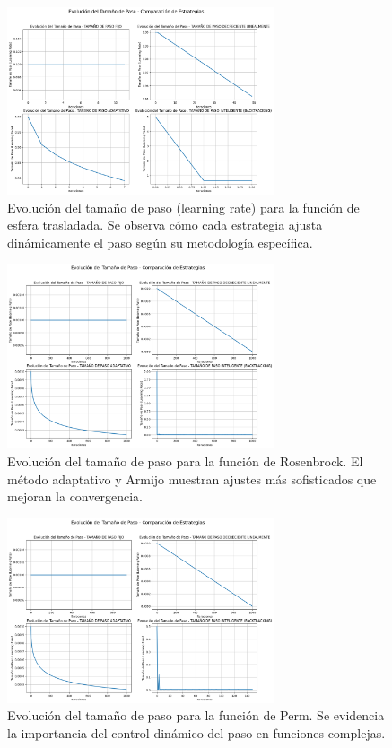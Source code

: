 \documentclass{article}
\begin{document}
\begin{figure}[H]
\centering
\includegraphics[width=0.7\textwidth]{images/8_sphere_lr.png}
\caption{Evolución del tamaño de paso (learning rate) para la función de esfera trasladada. Se observa cómo cada estrategia ajusta dinámicamente el paso según su metodología específica.}
\label{fig:lr_evolution_sphere}
\end{figure}

\begin{figure}[H]
\centering
\includegraphics[width=0.7\textwidth]{images/8_rosenbrock_lr.png}
\caption{Evolución del tamaño de paso para la función de Rosenbrock. El método adaptativo y Armijo muestran ajustes más sofisticados que mejoran la convergencia.}
\label{fig:lr_evolution_rosenbrock}
\end{figure}

\begin{figure}[H]
\centering
\includegraphics[width=0.7\textwidth]{images/8_perm_lr.png}
\caption{Evolución del tamaño de paso para la función de Perm. Se evidencia la importancia del control dinámico del paso en funciones complejas.}
\label{fig:lr_evolution_perm}
\end{figure}
\end{document}
